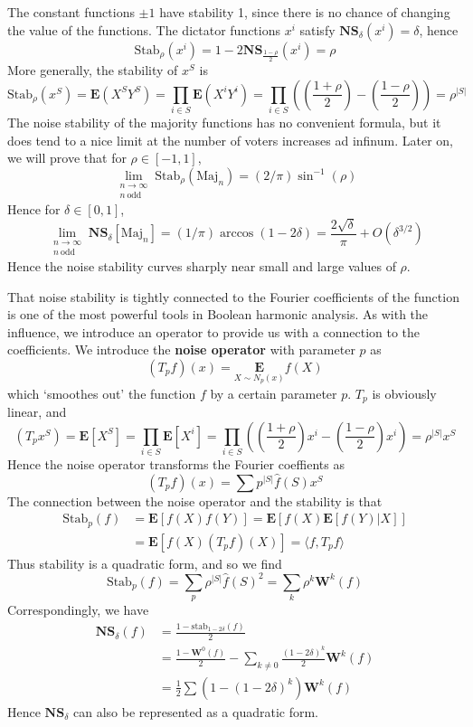 \begin{example}
    The constant functions $\pm 1$ have stability 1, since there is no chance of changing the value of the functions. The dictator functions $x^i$ satisfy $\mathbf{NS}_\delta(x^i) = \delta$, hence
    \[ \text{Stab}_\rho(x^i) = 1 - 2 \mathbf{NS}_{\frac{1 - \rho}{2}}(x^i) = \rho \]
    More generally, the stability of $x^S$ is
    \[ \text{Stab}_\rho(x^S) = \mathbf{E}(X^SY^S) = \prod_{i \in S} \mathbf{E}(X^iY^i) = \prod_{i \in S} \left( \left( \frac{1 + \rho}{2} \right) - \left( \frac{1 - \rho}{2} \right) \right) = \rho^{|S|} \]
    The noise stability of the majority functions has no convenient formula, but it does tend to a nice limit at the number of voters increases ad infinum. Later on, we will prove that for $\rho \in [-1,1]$,
    \[ \lim_{\substack{n \to \infty\\n\ \text{odd}}} \text{Stab}_\rho(\text{Maj}_n) = (2/\pi) \sin^{-1}(\rho) \]
    Hence for $\delta \in [0,1]$,
    \[ \lim_{\substack{n \to \infty\\n\ \text{odd}}} \mathbf{NS}_\delta[\text{Maj}_n] = (1/\pi) \arccos(1 - 2 \delta) = \frac{2\sqrt{\delta}}{\pi} + O(\delta^{3/2}) \]
    Hence the noise stability curves sharply near small and large values of $\rho$.
\end{example}

That noise stability is tightly connected to the Fourier coefficients of the function is one of the most powerful tools in Boolean harmonic analysis. As with the influence, we introduce an operator to provide us with a connection to the coefficients. We introduce the {\bf noise operator} with parameter $p$ as
%
\[ (T_p f)(x) = \underset{X \sim N_p(x)}{\mathbf{E}} f(X) \]
%
which `smoothes out' the function $f$ by a certain parameter $p$. $T_p$ is obviously linear, and
%
\[ (T_p x^S) = \mathbf{E}[X^S] = \prod_{i \in S} \mathbf{E}[X^i] = \prod_{i \in S} \left( \left( \frac{1 + \rho}{2} \right) x^i - \left( \frac{1 - \rho}{2} \right) x^i \right) = \rho^{|S|} x^S \]
%
Hence the noise operator transforms the Fourier coeffients as
%
\[ (T_p f)(x) = \sum p^{|S|} \widehat{f}(S) x^S \]
%
The connection between the noise operator and the stability is that
%
\begin{align*}
    \text{Stab}_p(f) &= \mathbf{E}[f(X)f(Y)] = \mathbf{E}[f(X)\mathbf{E}[f(Y) | X]]\\
    &= \mathbf{E}[f(X) (T_pf)(X)] = \langle f, T_pf \rangle
\end{align*}
%
Thus stability is a quadratic form, and so we find
%
\[ \text{Stab}_p(f) = \sum_p \rho^{|S|} \widehat{f}(S)^2 = \sum_k \rho^k \mathbf{W}^k(f) \]
%
Correspondingly, we have
%
\begin{align*}
    \mathbf{NS}_\delta(f) &= \frac{1 - \text{stab}_{1 - 2\delta}(f)}{2}\\
    &= \frac{1 - \mathbf{W}^0(f)}{2} - \sum_{k \neq 0} \frac{(1 - 2\delta)^k}{2} \mathbf{W}^k(f)\\
    &= \frac{1}{2} \sum (1 - (1 - 2\delta)^k) \mathbf{W}^k(f)
\end{align*}
%
Hence $\mathbf{NS}_\delta$ can also be represented as a quadratic form.

